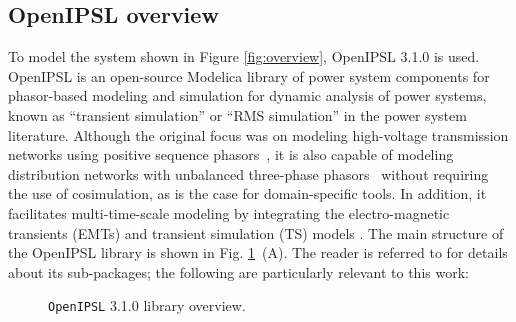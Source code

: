 \subsection{OpenIPSL overview}

To model the system shown in Figure \ref{fig:overview}, OpenIPSL 3.1.0 is used. OpenIPSL is an open-source Modelica library of power system components for phasor-based modeling and simulation for dynamic analysis of power systems, known as ``transient simulation'' or ``RMS simulation'' in the power system literature. Although the original focus was on modeling high-voltage transmission networks using positive sequence phasors~\cite{ipsl}, it is also capable of modeling distribution networks with unbalanced three-phase phasors~\cite{3phase} without requiring the use of cosimulation, as is the case for domain-specific tools. In addition, it facilitates multi-time-scale modeling by integrating the electro-magnetic transients (EMTs) and transient simulation (TS) models \cite{deCastro2025_OpenIWPI}. The main structure of the OpenIPSL library is shown in Fig. \ref{fig:openipsl}~(A). The reader is referred to \cite{ipsl, openipsl1p5, openipsl} for details about its sub-packages; the following are particularly relevant to this work:

\begin{figure}[t!]
    \centerline{}
    \vspace{-2ex}
    \caption{\texttt{OpenIPSL} 3.1.0 library overview.}
    \vspace{-2ex}
    \label{fig:openipsl}
\end{figure}

